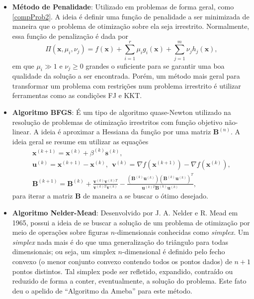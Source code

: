 \begin{itemize}
\item \textbf{M\'{e}todo de Penalidade}: Utilizado em problemas de forma geral, como \eqref{compProb2}. A ideia \'{e} definir uma fun\c{c}\~{a}o de penalidade a ser minimizada de maneira que o problema de otimiza\c{c}\~{a}o sobre ela seja irrestrito. Normalmente, essa fun\c{c}\~{a}o de penaliza\c{c}\~{a}o \'{e} dada por
\begin{equation}
\Pi(\mathbf{x},\mu_i,\nu_j) = f(\mathbf{x}) + \sum_{i=1}^{r} \mu_i g_i(\mathbf{x}) + \sum_{j=1}^{m} \nu_j h_j(\mathbf{x}),
\end{equation} 
em que $\mu_i \gg 1$ e $\nu_j \ge 0$ grandes o suficiente para se garantir uma boa qualidade da solu\c{c}\~{a}o a ser encontrada. Por\'{e}m, um m\'{e}todo mais geral para transformar um problema com restri\c{c}\~{o}es num problema irrestrito \'{e} utilizar ferramentas como as condi\c{c}\~{o}es FJ e KKT.

\item \textbf{Algoritmo BFGS}: \'{E} um tipo de algoritmo quase-Newton utilizado na resolu\c{c}\~{a}o de problemas de otimiza\c{c}\~{a}o irrestritos com fun\c{c}\~{a}o objetivo n\~{a}o-linear. A ideia \'{e} aproximar a Hessiana da fun\c{c}\~{a}o por uma matriz $\mathbf{B}^{(n)}$. A ideia geral se resume em utilizar as equa\c{c}\~{o}es
\begin{equation*}
\begin{array}{c}
\mathbf{x}^{(k+1)} = \mathbf{x}^{(k)} + \beta^{(k)} \mathbf{s}^{(k)},\\
\mathbf{u}^{(k)} = \mathbf{x}^{(k+1)} - \mathbf{x}^{(k)},~~\mathbf{v}^{(k)} = \nabla f(\mathbf{x}^{(k+1)}) - \nabla f(\mathbf{x}^{(k)}),\\
\mathbf{B}^{(k+1)} = \mathbf{B}^{(k)} + \frac{\mathbf{v}^{(k)}\mathbf{v}^{(k)T}}{\mathbf{v}^{(k)T}\mathbf{v}^{(k)}} - \frac{\left(\mathbf{B}^{(k)}\mathbf{u}^{(k)}\right)\left(\mathbf{B}^{(k)}\mathbf{u}^{(k)}\right)^{T}}{\mathbf{u}^{(k)T}\mathbf{B}^{(k)}\mathbf{u}^{(k)}},
\end{array}
\end{equation*}
para iterar a matriz $\mathbf{B}$ de maneira a se buscar o \'{o}timo desejado.

\item \textbf{Algoritmo Nelder-Mead}: Desenvolvido por J. A. Nelder e R. Mead em 1965, possui a ideia de se buscar a solu\c{c}\~{a}o de um problema de otimiza\c{c}\~{a}o por meio de opera\c{c}\~{o}es sobre figuras $n$-dimensionais conhecidas como \textit{simplex}. Um \textit{simplex} nada mais \'{e} do que uma generaliza\c{c}\~{a}o do tri\^{a}ngulo para todas dimensionais; ou seja, um simplex $n$-dimensional \'{e} definido pelo fecho convexo (o menor conjunto convexo contendo todos os pontos dados) de $n+1$ pontos distintos. Tal simplex pode ser refletido, expandido, contra\'{i}do ou reduzido de forma a conter, eventualmente, a solu\c{c}\~{a}o do problema. Este fato deu o apelido de ``Algoritmo da Ameba'' para este m\'{e}todo.


\end{itemize}

